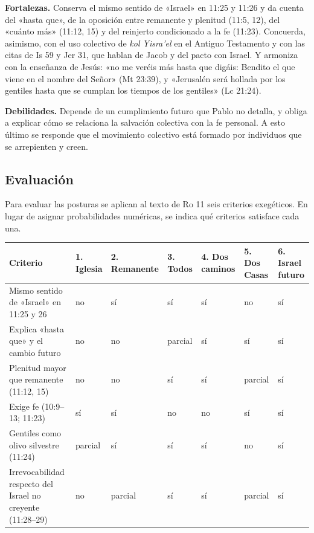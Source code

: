 \documentclass[11pt,letterpaper]{article}
\begin{document}
\textbf{Fortalezas.} Conserva el mismo sentido de «Israel» en 11:25 y 11:26 y da cuenta del «hasta que», de la oposición entre remanente y plenitud (11:5, 12), del «cuánto más» (11:12, 15) y del reinjerto condicionado a la fe (11:23). Concuerda, asimismo, con el uso colectivo de \emph{kol Yisra'el} en el Antiguo Testamento y con las citas de Is 59 y Jer 31, que hablan de Jacob y del pacto con Israel. Y armoniza con la enseñanza de Jesús: «no me veréis más hasta que digáis: Bendito el que viene en el nombre del Señor» (Mt 23:39), y «Jerusalén será hollada por los gentiles hasta que se cumplan los tiempos de los gentiles» (Lc 21:24).

\textbf{Debilidades.} Depende de un cumplimiento futuro que Pablo no detalla, y obliga a explicar cómo se relaciona la salvación colectiva con la fe personal. A esto último se responde que el movimiento colectivo está formado por individuos que se arrepienten y creen.

\subsection{Evaluación}
Para evaluar las posturas se aplican al texto de Ro 11 seis criterios exegéticos. En lugar de asignar probabilidades numéricas, se indica qué criterios satisface cada una.

\begin{center}\footnotesize
\renewcommand{\arraystretch}{1.3}
\begin{tabular}{>{\RaggedRight\arraybackslash}p{4.3cm}>{\centering\arraybackslash}p{1.3cm}>{\centering\arraybackslash}p{1.3cm}>{\centering\arraybackslash}p{1.3cm}>{\centering\arraybackslash}p{1.3cm}>{\centering\arraybackslash}p{1.3cm}>{\centering\arraybackslash}p{1.3cm}}
\toprule
\textbf{Criterio} & \textbf{1. Iglesia} & \textbf{2. Rema\-nente} & \textbf{3. Todos} & \textbf{4. Dos caminos} & \textbf{5. Dos Casas} & \textbf{6. Israel futuro}\\
\midrule
Mismo sentido de «Israel» en 11:25 y 26 & no & sí & sí & sí & no & sí\\
Explica «hasta que» y el cambio futuro & no & no & parcial & sí & sí & sí\\
Plenitud mayor que remanente (11:12, 15) & no & no & sí & sí & parcial & sí\\
Exige fe (10:9--13; 11:23) & sí & sí & no & no & sí & sí\\
Gentiles como olivo silvestre (11:24) & parcial & sí & sí & sí & no & sí\\
Irrevocabilidad respecto del Israel no creyente (11:28--29) & no & parcial & sí & sí & parcial & sí\\
\bottomrule
\end{tabular}\end{center}
\end{document}
